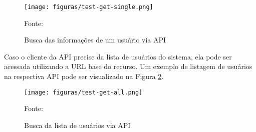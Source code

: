 \begin{figure}[H]
	\centering
	\caption{Busca das informações de um usuário via API}
	\texttt{[image: figuras/test-get-single.png]}

	\label{fig:test-get-single}
	\footnotesize Fonte: \fonteOAutor
\end{figure}

Caso o cliente da \ac{API} precise da lista de usuários do sistema, ela pode
ser acessada utilizando a \ac{URL} base do recurso. Um exemplo de listagem
de usuários na respectiva \ac{API} pode ser visualizado na Figura
\ref{fig:test-get-all}.

\begin{figure}[H]
	\centering
	\caption{Busca da lista de usuários via API}
	\texttt{[image: figuras/test-get-all.png]}

	\label{fig:test-get-all}
	\footnotesize Fonte: \fonteOAutor
\end{figure}
